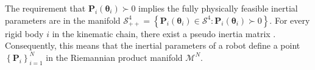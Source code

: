 The requirement that $\bm{P}_i(\bm{\theta}_i) \succ 0$ implies the fully physically feasible inertial parameters are in the manifold $\mathcal{S}^4_{++}=\left\lbrace \bm{P}_i(\bm{\theta}_i) \in \mathcal{S}^{4}: \bm{P}_i(\bm{\theta}_i) \succ 0 \right\rbrace$. For every rigid body $i$ in the kinematic chain, there exist a pseudo inertia matrix  \cite{Lee2018geometricalgorithmrobust}. Consequently, this means that the inertial parameters of a robot define a point $\left\lbrace \bm{P}_i\right\rbrace_{i=1}^N$ in the Riemannian product manifold $\mathcal{M}^N$.


